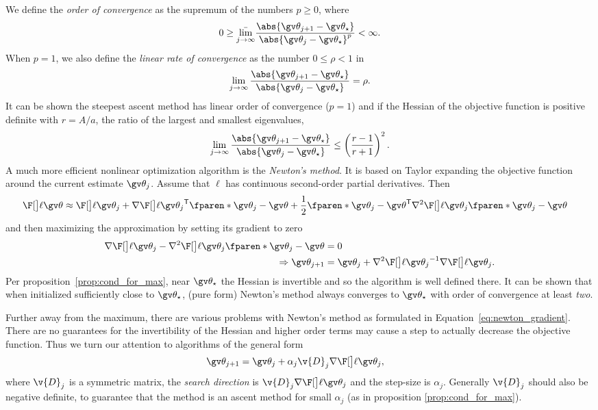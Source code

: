 We define the \emph{order of convergence} as the supremum of the
numbers $p\geq 0$, where
\begin{align}
	0\geq \bar{\lim_{j\to\infty}}\frac{\abs{\Th_{j+1}-\Th_\star}}{\abs{\Th_{j}-\Th_\star}^p} < \infty.
	\label{eq:order_of_convergence}
\end{align}
When $p=1$, we also define the \emph{linear rate of convergence} as
the number $0 \leq \rho < 1$ in
\begin{align}
	\lim_{j\to\infty}\frac{\abs{\Th_{j+1}-\Th_\star}}{\abs{\Th_{j}-\Th_\star}} = \rho.
	\label{eq:rate_of_convergence}
\end{align}
It can be shown the steepest ascent method has linear order of convergence ($p=1$)
and if the Hessian of the objective function is positive definite with
$r=A/a$, the ratio of the largest and smallest eigenvalues, 
\begin{align}
	\lim_{j\to\infty}\frac{\abs{\Th_{j+1}-\Th_\star}}{\abs{\Th_{j}-\Th_\star}} \leq \left(\frac{r-1}{r+1}\right)^2.
\end{align}
A much more efficient nonlinear optimization algorithm is the \emph{Newton's method}.
It is based on Taylor expanding the objective function around the
current estimate $\Th_j$. Assume that $\ell$ has continuous second-order partial derivatives. Then
\begin{align}
	\lLH[\Th] &\approx \lLH[\Th_j]+\nabla\lLH[\Th_j]^\tr\fparen*{\Th_j-\Th}+\frac{1}{2}\fparen*{\Th_j-\Th}^\tr\nabla^2\lLH[\Th_j]\fparen*{\Th_j-\Th}
	\label{eq:second_order_expansion}
\end{align}
and then maximizing the approximation by setting its gradient to zero
\begin{align}
	\nabla\lLH[\Th_j]-\nabla^2\lLH[\Th_j]\fparen*{\Th_j-\Th} &= 0\\
	\Rightarrow \Th_{j+1} &= \Th_j+\nabla^2\lLH[\Th_j]^{-1}\nabla\lLH[\Th_j].
	\label{eq:newton_gradient}
\end{align}
Per proposition~\ref{prop:cond_for_max}, near $\Th_\star$ the Hessian is 
invertible and so the algorithm is well defined there. It can be shown
that when initialized sufficiently close to $\Th_\star$, (pure form)
Newton's method always converges to $\Th_\star$ with order of convergence
at least \emph{two}.
 
Further away from the maximum, there are various problems with Newton's method as formulated
in Equation~\eqref{eq:newton_gradient}. There are no guarantees for the invertibility
of the Hessian and higher order terms may cause a step to actually decrease the objective
function. Thus we turn our attention to algorithms of the general form
\begin{align}
	\Th_{j+1} &= \Th_j+\alpha_j\v{D}_j\nabla\lLH[\Th_j],
	\label{eq:gradient_method_general}
\end{align}
where $\v{D}_j$ is a symmetric matrix, the \emph{search direction} is $\v{D}_j\nabla\lLH[\Th_j]$ and
the step-size is $\alpha_j$. Generally $\v{D}_j$ should also be negative definite, to guarantee
that the method is an ascent method for small $\alpha_j$ (as in proposition \eqref{prop:cond_for_max}).
  
